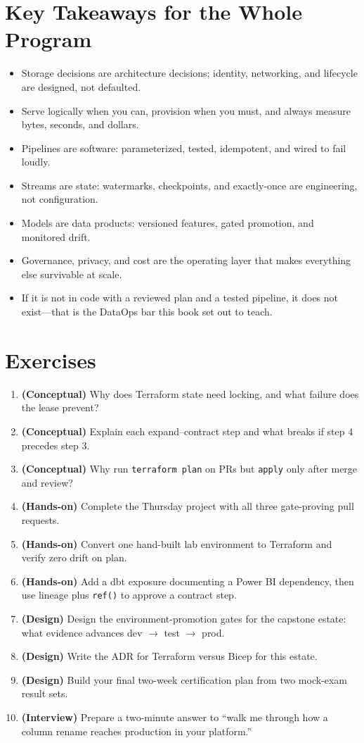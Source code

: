 \section{Key Takeaways for the Whole Program}
\begin{itemize}
    \item Storage decisions are architecture decisions; identity, networking, and lifecycle are designed, not defaulted.
    \item Serve logically when you can, provision when you must, and always measure bytes, seconds, and dollars.
    \item Pipelines are software: parameterized, tested, idempotent, and wired to fail loudly.
    \item Streams are state: watermarks, checkpoints, and exactly-once are engineering, not configuration.
    \item Models are data products: versioned features, gated promotion, and monitored drift.
    \item Governance, privacy, and cost are the operating layer that makes everything else survivable at scale.
    \item If it is not in code with a reviewed plan and a tested pipeline, it does not exist---that is the DataOps bar this book set out to teach.
\end{itemize}

\section{Exercises}
\begin{enumerate}
    \item \textbf{(Conceptual)} Why does Terraform state need locking, and what failure does the lease prevent?
    \item \textbf{(Conceptual)} Explain each expand--contract step and what breaks if step 4 precedes step 3.
    \item \textbf{(Conceptual)} Why run \texttt{terraform plan} on PRs but \texttt{apply} only after merge and review?
    \item \textbf{(Hands-on)} Complete the Thursday project with all three gate-proving pull requests.
    \item \textbf{(Hands-on)} Convert one hand-built lab environment to Terraform and verify zero drift on plan.
    \item \textbf{(Hands-on)} Add a dbt exposure documenting a Power BI dependency, then use lineage plus \texttt{ref()} to approve a contract step.
    \item \textbf{(Design)} Design the environment-promotion gates for the capstone estate: what evidence advances dev $\rightarrow$ test $\rightarrow$ prod.
    \item \textbf{(Design)} Write the ADR for Terraform versus Bicep for this estate.
    \item \textbf{(Design)} Build your final two-week certification plan from two mock-exam result sets.
    \item \textbf{(Interview)} Prepare a two-minute answer to ``walk me through how a column rename reaches production in your platform.''
\end{enumerate}
